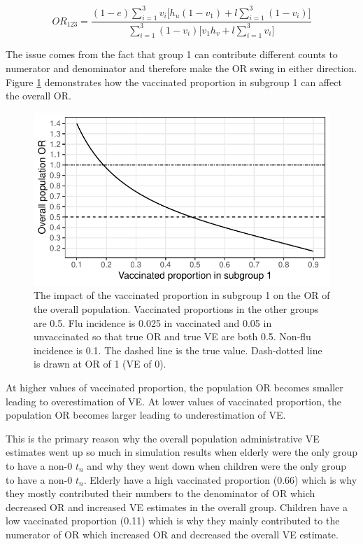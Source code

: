 \documentclass[11pt]{article}
\begin{document}
\begin{equation} \label{ORBad}
OR_{1 2 3} = \frac
{(1-e) \sum_{i=1}^3 v_i \Big[ h_u(1-v_1) + l\sum_{i=1}^3(1-v_i) \Big]}
{\sum_{i=1}^3 (1-v_i) \Big[ v_1h_v+l \sum_{i=1}^3 v_i \Big]}
\end{equation}

The issue comes from the fact that group 1 can contribute different counts to numerator and denominator and therefore make the OR swing in either direction. Figure \ref{fig:ortn} demonstrates how the vaccinated proportion in subgroup 1 can affect the overall OR.

\pagebreak

\begin{figure}[h]
	\centering
		\includegraphics[width=0.75\linewidth]{../fig-ortn/fig-ortn.pdf}
		\caption{
The impact of the vaccinated proportion in subgroup 1 on the OR of the overall population. Vaccinated proportions in the other groups are 0.5. Flu incidence is 0.025 in vaccinated and 0.05 in unvaccinated so that true OR and true VE are both 0.5. Non-flu incidence is 0.1. The dashed line is the true value. Dash-dotted line is drawn at OR of 1 (VE of 0). \label{fig:ortn}
		}
\end{figure}

At higher values of vaccinated proportion, the population OR becomes smaller leading to overestimation of VE. At lower values of vaccinated proportion, the population OR becomes larger leading to underestimation of VE.

This is the primary reason why the overall population administrative VE estimates went up so much in simulation results when elderly were the only group to have a non-0 $t_n$ and why they went down when children were the only group to have a non-0 $t_n$. Elderly have a high vaccinated proportion (0.66) which is why they mostly contributed their numbers to the denominator of OR which decreased OR and increased VE estimates in the overall group. Children have a low vaccinated proportion (0.11) which is why they mainly contributed to the numerator of OR which increased OR and decreased the overall VE estimate. 
\end{document}
